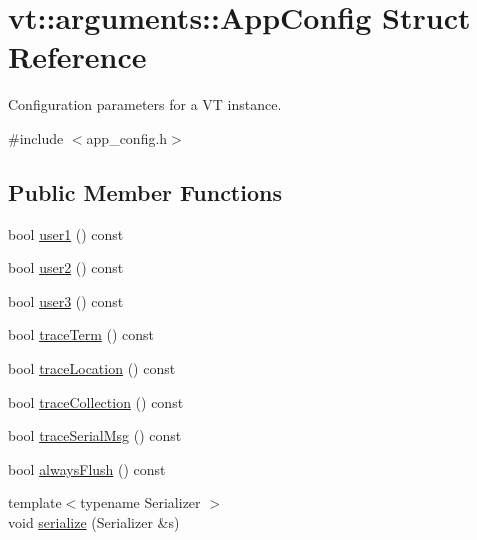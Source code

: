 \hypertarget{structvt_1_1arguments_1_1_app_config}{}\section{vt\+:\+:arguments\+:\+:App\+Config Struct Reference}
\label{structvt_1_1arguments_1_1_app_config}


Configuration parameters for a VT instance.  




{\ttfamily \#include $<$app\+\_\+config.\+h$>$}

\subsection*{Public Member Functions}
\begin{DoxyCompactItemize}
\item 
bool \hyperlink{structvt_1_1arguments_1_1_app_config_a2f94b5667c784de4398cb27110555e86}{user1} () const
\item 
bool \hyperlink{structvt_1_1arguments_1_1_app_config_ab504a2952d75b3f1fa9d81e8122cbc41}{user2} () const
\item 
bool \hyperlink{structvt_1_1arguments_1_1_app_config_ad11c798fedeafd2d5ec3f6737226afad}{user3} () const
\item 
bool \hyperlink{structvt_1_1arguments_1_1_app_config_afbe5bc2d7e470809bc204a30158ba96e}{trace\+Term} () const
\item 
bool \hyperlink{structvt_1_1arguments_1_1_app_config_a3a3b55a1c4f5a6b001e346d8b5ce084a}{trace\+Location} () const
\item 
bool \hyperlink{structvt_1_1arguments_1_1_app_config_adddc5276b065e2ea1c7a9b0626a8ce0d}{trace\+Collection} () const
\item 
bool \hyperlink{structvt_1_1arguments_1_1_app_config_a81f20c5bbc19af108fd9487e2a98b003}{trace\+Serial\+Msg} () const
\item 
bool \hyperlink{structvt_1_1arguments_1_1_app_config_adea8d58f81c4df7df475ac9f7780decc}{always\+Flush} () const
\item 
{\footnotesize template$<$typename Serializer $>$ }\\void \hyperlink{structvt_1_1arguments_1_1_app_config_af328ae786d91e9efb5f92d6a00b1cde1}{serialize} (Serializer \&s)
\end{DoxyCompactItemize}
